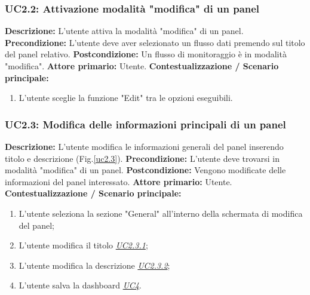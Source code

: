                 \subsubsection{UC2.2: Attivazione modalità "modifica" di un panel}
                    \textbf{Descrizione:} L'utente attiva la modalità "modifica" di un panel.
                    \newline
                    \textbf{Precondizione:} L'utente deve aver selezionato un flusso dati premendo sul titolo del panel relativo.
                    \newline
                    \textbf{Postcondizione:} Un flusso di monitoraggio è in modalità "modifica".
                    \newline
                    \textbf{Attore primario:} Utente.
                    \newline
                    \textbf{Contestualizzazione / Scenario principale:} \begin{enumerate}
                        \item L’utente sceglie la funzione "Edit" tra le opzioni eseguibili.
                    \end{enumerate}
                    
                    
                    
                \subsubsection{UC2.3:  Modifica delle informazioni principali di un panel}
                    \textbf{Descrizione:} L’utente modifica le informazioni generali del panel inserendo titolo e descrizione (Fig.\ref{uc2.3}).
                    \newline
                    \textbf{Precondizione:} L'utente deve trovarsi in modalità "modifica" di un panel.
                    \newline
                    \textbf{Postcondizione:} Vengono modificate delle informazioni del panel interessato.
                    \newline
                    \textbf{Attore primario:} Utente.
                    \newline
                    \textbf{Contestualizzazione / Scenario principale:} \begin{enumerate}
                        \item L'utente seleziona la sezione "General" all'interno della schermata di modifica del panel;
                        \item L’utente modifica il titolo \underline{\textit{UC2.3.1}};
                        \item L’utente modifica la descrizione \underline{\textit{UC2.3.2}};
                        \item L'utente salva la dashboard \underline{\textit{UC4}}.
                    \end{enumerate}
                    
